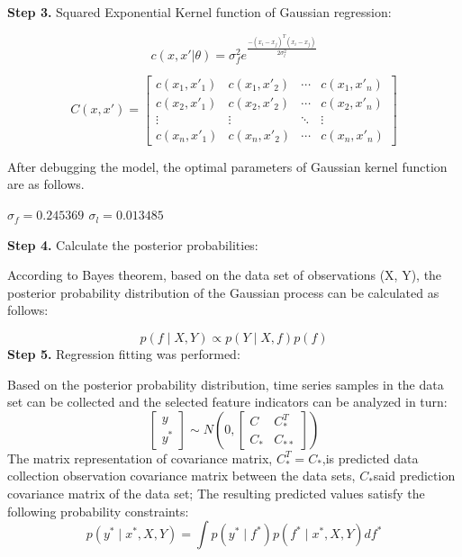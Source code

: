 \documentclass{apmcmthesis}
\begin{document}
	\noindent\textbf{Step 3. }Squared Exponential Kernel function of Gaussian regression:
	
	\begin{equation}
		\tag{7-2-3}
		c(x,x'|\theta)=\sigma^{2}_{f}e^{\frac{-(x_{i}-x_{j})^{T}(x_{i}-x_{j})}{2\sigma_{l}^{2}}}
	\end{equation}

	\begin{equation}
		\tag{7-2-4}
		C(x,x')=\begin{bmatrix}
			c(x_{1},x'_{1}) &	c(x_{1},x'_{2})&\cdots&	c(x_{1},x'_{n}) \\
			c(x_{2},x'_{1}) & 	c(x_{2},x'_{2})	&\cdots&	c(x_{2},x'_{n})\\
			\vdots & \vdots & \ddots &\vdots \\
			c(x_{n},x'_{1})& 	c(x_{n},x'_{2})& 	\cdots&	c(x_{n},x'_{n})	
		\end{bmatrix}
	\end{equation}
	
	After debugging the model, the optimal parameters of Gaussian kernel function are as follows.
	
\qquad	\textbf{ $\sigma_{f} = 0.245369$ \qquad $\sigma_{l} = 0.013485$}
	 
	\noindent\textbf{Step 4. }Calculate the posterior probabilities:
	
	According to Bayes theorem, based on the data set of observations (X, Y), the posterior probability distribution of the Gaussian process can be calculated as follows:
	
	\begin{equation}
		\tag{7-2-5} 
		p(f\mid X,Y) \propto p(Y\mid X,f)p(f)
	\end{equation}
	\noindent\textbf{Step 5. }Regression fitting was performed:
	
	Based on the posterior probability distribution, time series samples in the data set can be collected and the selected feature indicators can be analyzed in turn:
	\begin{equation}
		\tag{7-2-6}
	   \begin{bmatrix} 
			y 	\\
			y^{*}
			\end{bmatrix} 
			\sim N\left(0,\begin{bmatrix} 
			C & C^{T}_{*} \\
			C_{*} & C_{**}
		\end{bmatrix} 
		\right)
	\end{equation}
	The matrix representation of covariance matrix, $C ^ {T} _ {*} = C_ {*} $,is predicted data collection observation covariance matrix between the data sets, $C_ {*} $said prediction covariance matrix of the data set; The resulting predicted values satisfy the following probability constraints:
	\begin{equation}
		\tag{7-2-7}
		p(y^{*}\mid x^{*},X,Y) = \int p(y^{*}\mid f^{*})p(f^{*}\mid x^{*},X,Y)df^{*}
	\end{equation}
\end{document}
